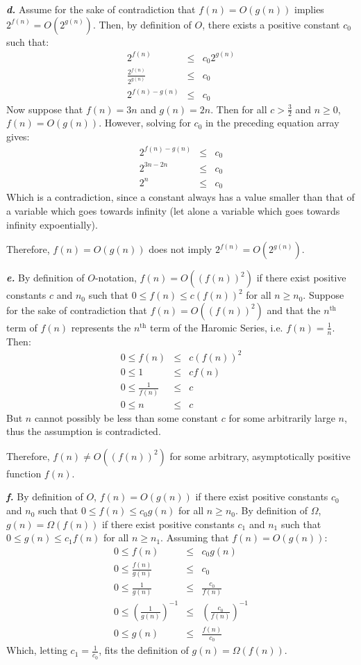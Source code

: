 \noindent\textbf{\textit{d.}} Assume for the sake of contradiction that $f(n) = O(g(n))$ implies $ 2^{f(n)} = O(2^{g(n)})$. Then, by definition of $O$, there exists a positive constant $c_0$ such that:
\begin{eqnarray*}
	2^{f(n)} & \leq & c_0 2^{g(n)} \\
	\frac{2^{f(n)}}{2^{g(n)}} & \leq & c_0 \\
	2^{f(n) - g(n)} & \leq & c_0
\end{eqnarray*}
Now suppose that $f(n) = 3n$ and $g(n) = 2n$. Then for all $c > \frac{3}{2}$ and $n \geq 0$, $f(n) = O(g(n))$. However, solving for $c_0$ in the preceding equation array gives:
\begin{eqnarray*}
	2^{f(n) - g(n)} & \leq & c_0 \\
	2^{3n - 2n} & \leq & c_0 \\
	2^n & \leq & c_0
\end{eqnarray*}
Which is a contradiction, since a constant always has a value smaller than that of a variable which goes towards infinity (let alone a variable which goes towards infinity expoentially).

Therefore, $f(n) = O(g(n))$ does not imply $2^{f(n)} = O(2^{g(n)})$.

\noindent\textbf{\textit{e.}} By definition of $O$-notation, $f(n) = O((f(n))^2)$ if there exist positive constants $c$ and $n_0$ such that $0 \leq f(n) \leq c (f(n))^2$ for all $n \geq n_0$. Suppose for the sake of contradiction that $f(n) = O((f(n))^2)$ and that the $n^{\text{th}}$ term of $f(n)$ represents the $n^{\text{th}}$ term of the Haromic Series, i.e. $f(n) = \frac{1}{n}$. Then:
\begin{eqnarray*}
	0 \leq f(n) & \leq & c (f(n))^2 \\
	0 \leq 1 & \leq & c f(n) \\
	0 \leq \frac{1}{f(n)} & \leq & c \\
	0 \leq n & \leq & c
\end{eqnarray*}
But $n$ cannot possibly be less than some constant $c$ for some arbitrarily large $n$, thus the assumption is contradicted.

Therefore, $f(n) \neq O((f(n))^2)$ for some arbitrary, asymptotically positive function $f(n)$.

\noindent\textbf{\textit{f.}} By definition of $O$, $f(n) = O(g(n))$ if there exist positive constants $c_0$ and $n_0$ such that $0 \leq f(n) \leq c_0 g(n)$ for all $n \geq n_0$. By definition of $\Omega$, $g(n) = \Omega(f(n))$ if there exist positive constants $c_1$ and $n_1$ such that $0 \leq g(n) \leq c_1 f(n)$ for all $n \geq n_1$. Assuming that $f(n) = O(g(n))$:
\begin{eqnarray*}
	0 \leq f(n) & \leq & c_0 g(n) \\
	0 \leq \frac{f(n)}{g(n)} & \leq & c_0 \\
	0 \leq \frac{1}{g(n)} & \leq & \frac{c_0}{f(n)} \\
	0 \leq \left ( \frac{1}{g(n)} \right )^{-1} & \leq & \left ( \frac{c_0}{f(n)} \right )^{-1} \\
	0 \leq g(n) & \leq & \frac{f(n)}{c_0}
\end{eqnarray*}
Which, letting $c_1 = \frac{1}{c_0}$, fits the definition of $g(n) = \Omega(f(n))$.


